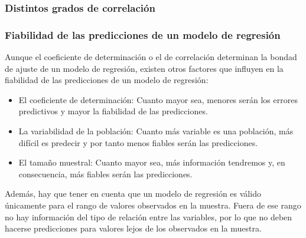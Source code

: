 \begin{frame}
\frametitle{Distintos grados de correlación}
\centering
{}
\resizebox{\textwidth}{!}{}
\end{frame}


\begin{frame}
\frametitle{Fiabilidad de las predicciones de un modelo de regresión}
Aunque el coeficiente de determinación o el de correlación determinan la bondad de ajuste de un modelo de regresión, existen otros factores que influyen en la fiabilidad de las predicciones de un modelo de regresión:
\begin{itemize}
\item El coeficiente de determinación: Cuanto mayor sea, menores serán los errores predictivos y mayor la fiabilidad de las predicciones.
\item La variabilidad de la población: Cuanto más variable es una población, más difícil es predecir y por tanto menos fiables serán las
predicciones.
\item El tamaño muestral: Cuanto mayor sea, más información tendremos y, en consecuencia, más fiables serán las predicciones. 
\end{itemize} 

Además, hay que tener en cuenta que un modelo de regresión es válido únicamente para el rango de valores observados en la muestra.
Fuera de ese rango no hay información del tipo de relación entre las variables, por lo que no deben hacerse predicciones para valores lejos de los observados en la muestra.

\end{frame}


